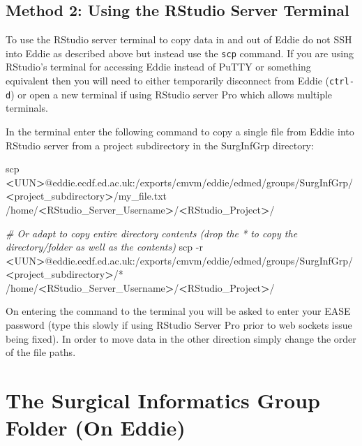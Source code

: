 \documentclass[
]{book}
\newenvironment{Shaded}{\begin{snugshade}}{\end{snugshade}}
\newcommand{\CommentTok}[1]{\textcolor[rgb]{0.56,0.35,0.01}{\textit{#1}}}
\newcommand{\FunctionTok}[1]{\textcolor[rgb]{0.00,0.00,0.00}{#1}}
\newcommand{\NormalTok}[1]{#1}
\newcommand{\OperatorTok}[1]{\textcolor[rgb]{0.81,0.36,0.00}{\textbf{#1}}}
\begin{document}
\hypertarget{method-2-using-the-rstudio-server-terminal}{%
\subsection{Method 2: Using the RStudio Server Terminal}\label{method-2-using-the-rstudio-server-terminal}}

To use the RStudio server terminal to copy data in and out of Eddie do not SSH into Eddie as described above but instead use the \texttt{scp} command. If you are using RStudio's terminal for accessing Eddie instead of PuTTY or something equivalent then you will need to either temporarily disconnect from Eddie (\texttt{ctrl-d}) or open a new terminal if using RStudio server Pro which allows multiple terminals.

In the terminal enter the following command to copy a single file from Eddie into RStudio server from a project subdirectory in the SurgInfGrp directory:

\begin{Shaded}
\begin{Highlighting}[]
\FunctionTok{scp} \OperatorTok{<}\NormalTok{UUN}\OperatorTok{>}\NormalTok{@eddie.ecdf.ed.ac.uk:/exports/cmvm/eddie/edmed/groups/SurgInfGrp/}\OperatorTok{<}\NormalTok{project_subdirectory}\OperatorTok{>}\NormalTok{/my_file.txt /home/}\OperatorTok{<}\NormalTok{RStudio_Server_Username}\OperatorTok{>}\NormalTok{/}\OperatorTok{<}\NormalTok{RStudio_Project}\OperatorTok{>}\NormalTok{/}

\CommentTok{# Or adapt to copy entire directory contents (drop the * to copy the directory/folder as well as the contents)}
\FunctionTok{scp}\NormalTok{ -r }\OperatorTok{<}\NormalTok{UUN}\OperatorTok{>}\NormalTok{@eddie.ecdf.ed.ac.uk:/exports/cmvm/eddie/edmed/groups/SurgInfGrp/}\OperatorTok{<}\NormalTok{project_subdirectory}\OperatorTok{>}\NormalTok{/* /home/}\OperatorTok{<}\NormalTok{RStudio_Server_Username}\OperatorTok{>}\NormalTok{/}\OperatorTok{<}\NormalTok{RStudio_Project}\OperatorTok{>}\NormalTok{/}
\end{Highlighting}
\end{Shaded}

On entering the command to the terminal you will be asked to enter your EASE password (type this slowly if using RStudio Server Pro prior to web sockets issue being fixed). In order to move data in the other direction simply change the order of the file paths.

\hypertarget{the-surgical-informatics-group-folder-on-eddie}{%
\section{The Surgical Informatics Group Folder (On Eddie)}\label{the-surgical-informatics-group-folder-on-eddie}}
\end{document}
